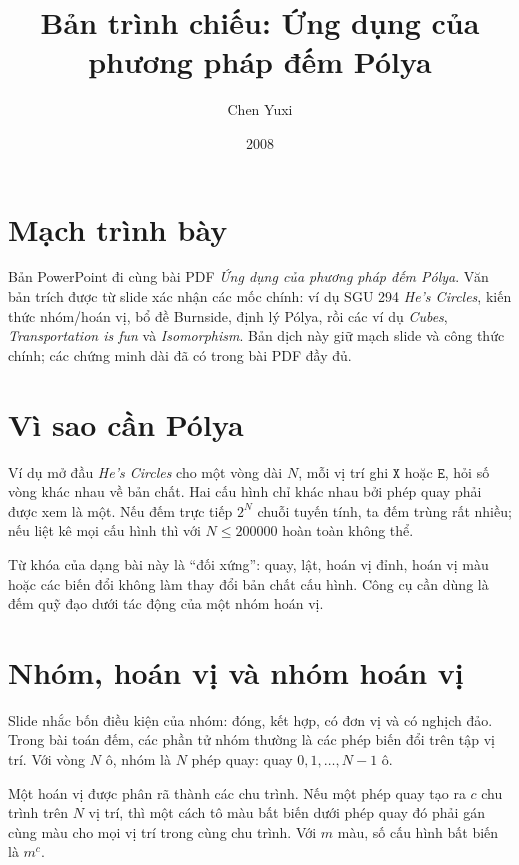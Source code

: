\documentclass[11pt]{article}
\title{Bản trình chiếu: Ứng dụng của phương pháp đếm Pólya}
\author{Chen Yuxi}
\date{2008}
\begin{document}
\maketitle


\section{Mạch trình bày}

Bản PowerPoint đi cùng bài PDF \emph{Ứng dụng của phương pháp đếm Pólya}. Văn
bản trích được từ slide xác nhận các mốc chính: ví dụ SGU 294 \textit{He's
Circles}, kiến thức nhóm/hoán vị, bổ đề Burnside, định lý Pólya, rồi các ví
dụ \textit{Cubes}, \textit{Transportation is fun} và \textit{Isomorphism}. Bản
dịch này giữ mạch slide và công thức chính; các chứng minh dài đã có trong
bài PDF đầy đủ.

\section{Vì sao cần Pólya}

Ví dụ mở đầu \textit{He's Circles} cho một vòng dài \(N\), mỗi vị trí ghi
\(\texttt{X}\) hoặc \(\texttt{E}\), hỏi số vòng khác nhau về bản chất. Hai cấu
hình chỉ khác nhau bởi phép quay phải được xem là một. Nếu đếm trực tiếp
\(2^N\) chuỗi tuyến tính, ta đếm trùng rất nhiều; nếu liệt kê mọi cấu hình thì
với \(N\le 200000\) hoàn toàn không thể.

Từ khóa của dạng bài này là ``đối xứng'': quay, lật, hoán vị đỉnh, hoán vị màu
hoặc các biến đổi không làm thay đổi bản chất cấu hình. Công cụ cần dùng là
đếm quỹ đạo dưới tác động của một nhóm hoán vị.

\section{Nhóm, hoán vị và nhóm hoán vị}

Slide nhắc bốn điều kiện của nhóm: đóng, kết hợp, có đơn vị và có nghịch đảo.
Trong bài toán đếm, các phần tử nhóm thường là các phép biến đổi trên tập vị
trí. Với vòng \(N\) ô, nhóm là \(N\) phép quay: quay \(0,1,\ldots,N-1\) ô.

Một hoán vị được phân rã thành các chu trình. Nếu một phép quay tạo ra
\(c\) chu trình trên \(N\) vị trí, thì một cách tô màu bất biến dưới phép quay
đó phải gán cùng màu cho mọi vị trí trong cùng chu trình. Với \(m\) màu, số
cấu hình bất biến là \(m^c\).
\end{document}
